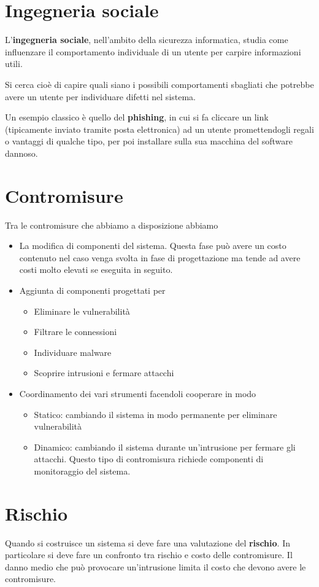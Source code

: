 \section{Ingegneria sociale}
L'\textbf{ingegneria sociale}, nell'ambito della sicurezza informatica, studia come influenzare il comportamento
individuale di un utente per carpire informazioni utili.

Si cerca cioè di capire quali siano i possibili comportamenti sbagliati che potrebbe avere un utente per individuare
difetti nel sistema.

Un esempio classico è quello del \textbf{phishing}, in cui si fa cliccare un link (tipicamente inviato tramite posta
elettronica) ad un utente promettendogli regali o vantaggi di qualche tipo, per poi installare sulla sua macchina
del software dannoso.

\section{Contromisure}
Tra le contromisure che abbiamo a disposizione abbiamo
\begin{itemize}
	\item La modifica di componenti del sistema. Questa fase può avere un costo contenuto nel caso venga svolta in
	      fase di progettazione ma tende ad avere costi molto elevati se eseguita in seguito.
	\item Aggiunta di componenti progettati per
	      \begin{itemize}
		      \item Eliminare le vulnerabilità
		      \item Filtrare le connessioni
		      \item Individuare malware
		      \item Scoprire intrusioni e fermare attacchi
	      \end{itemize}
	\item Coordinamento dei vari strumenti facendoli cooperare in modo
	      \begin{itemize}
		      \item Statico: cambiando il sistema in modo permanente per eliminare vulnerabilità
		      \item Dinamico: cambiando il sistema durante un'intrusione per fermare gli attacchi. Questo tipo di
		            contromisura richiede componenti di monitoraggio del sistema.
	      \end{itemize}
\end{itemize}

\section{Rischio}
Quando si costruisce un sistema si deve fare una valutazione del \textbf{rischio}. In particolare si deve fare un
confronto tra rischio e costo delle contromisure. Il danno medio che può provocare un'intrusione limita il costo che
devono avere le contromisure.
